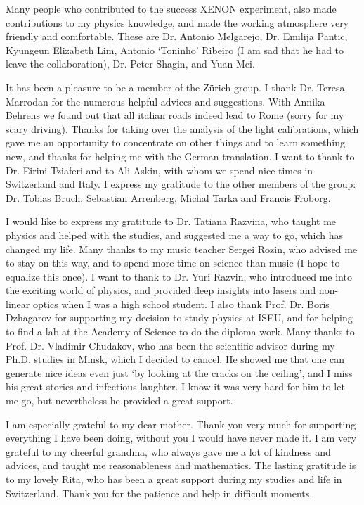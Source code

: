 Many people who contributed to the success XENON experiment, also made contributions to my physics knowledge, and made the working atmosphere very friendly and comfortable. These are Dr. Antonio Melgarejo, Dr. Emilija Pantic, Kyungeun Elizabeth Lim, Antonio `Toninho' Ribeiro (I am sad that he had to leave the collaboration), Dr. Peter Shagin, and Yuan Mei.

It has been a pleasure to be a member of the Z\"urich group. I thank Dr. Teresa Marrodan for the numerous helpful advices and suggestions. With Annika Behrens we found out that all italian roads indeed lead to Rome (sorry for my scary driving). Thanks for taking over the analysis of the light calibrations, which gave me an opportunity to concentrate on other things and to learn something new, and thanks for helping me with the German translation. I want to thank to Dr. Eirini Tziaferi and to Ali Askin, with whom we spend nice times in Switzerland and Italy. I express my gratitude to the other members of the group: Dr. Tobias Bruch, Sebastian Arrenberg, Michal Tarka and Francis Froborg.

I would like to express my gratitude to Dr. Tatiana Razvina, who taught me physics and helped with the studies, and suggested me a way to go, which has changed my life. Many thanks to my music teacher Sergei Rozin, who advised me to stay on this way, and to spend more time on science than music (I hope to equalize this once). I want to thank to Dr. Yuri Razvin, who introduced me into the exciting world of physics, and provided deep insights into lasers and non-linear optics when I was a high school student. I also thank Prof. Dr. Boris Dzhagarov for supporting my decision to study physics at ISEU, and for helping to find a lab at the Academy of Science to do the diploma work. Many thanks to Prof. Dr. Vladimir Chudakov, who has been the scientific advisor during my Ph.D. studies in Minsk, which I decided to cancel. He showed me that one can generate nice ideas even just `by looking at the cracks on the ceiling', and I miss his great stories and infectious laughter. I know it was very hard for him to let me go, but nevertheless he provided a great support.

I am especially grateful to my dear mother. Thank you very much for supporting everything I have been doing, without you I would have never made it. I am very grateful to my cheerful grandma, who always gave me a lot of kindness and advices, and taught me reasonableness and mathematics. The lasting gratitude is to my lovely Rita, who has been a great support during my studies and life in Switzerland. Thank you for the patience and help in difficult moments.
